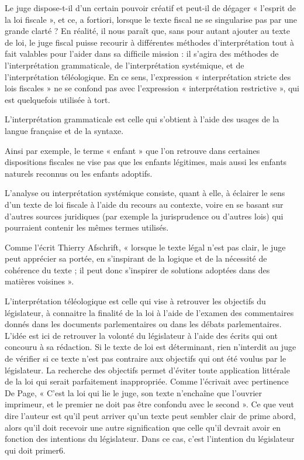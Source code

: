 \documentclass{book}
\begin{document}
Le juge dispose-t-il d’un certain pouvoir créatif et peut-il de dégager « l’esprit de la loi ﬁscale », et ce, a fortiori, lorsque le texte ﬁscal ne se singularise pas par une grande clarté ? En réalité, il nous paraît que, sans pour autant ajouter au texte de loi, le juge ﬁscal puisse recourir à différentes méthodes d’interprétation tout à fait valables pour l’aider dans sa difﬁcile mission : il s’agira des méthodes de l’interprétation grammaticale, de l’interprétation systémique, et de l’interprétation téléologique. En ce sens, l’expression « interprétation stricte des lois ﬁscales » ne se confond pas avec l’expression « interprétation restrictive », qui est quelquefois utilisée à tort.

L’interprétation grammaticale est celle qui s’obtient à l’aide des usages de la langue française et de la syntaxe.

Ainsi par exemple, le terme « enfant » que l’on retrouve dans certaines dispositions ﬁscales ne vise pas que les enfants légitimes, mais aussi les enfants naturels reconnus ou les enfants adoptifs.

L’analyse ou interprétation systémique consiste, quant à elle, à éclairer le sens d’un texte de loi ﬁscale à l’aide du recours au contexte, voire en se basant sur d’autres sources juridiques (par exemple la jurisprudence ou d’autres lois) qui pourraient contenir les mêmes termes utilisés.

Comme l’écrit Thierry Afschrift, « lorsque le texte légal n’est pas clair, le juge peut apprécier sa portée, en s’inspirant de la logique et de la nécessité de cohérence du texte ; il peut donc s’inspirer de solutions adoptées dans des matières voisines ».

L’interprétation téléologique est celle qui vise à retrouver les objectifs du législateur, à connaitre la ﬁnalité de la loi à l’aide de l’examen des commentaires donnés dans les documents parlementaires ou dans les débats parlementaires. L’idée est ici de retrouver la volonté du législateur à l’aide des écrits qui ont concouru à sa rédaction. Si le texte de loi est déterminant, rien n’interdit au juge de vériﬁer si ce texte n’est pas contraire aux objectifs qui ont été voulus par le législateur. La recherche des objectifs permet d’éviter toute application littérale de la loi qui serait parfaitement inappropriée. Comme l’écrivait avec pertinence De Page, « C’est la loi qui lie le juge, son texte n’enchaîne que l’ouvrier imprimeur, et le premier ne doit pas être confondu avec le second ». Ce que veut dire l’auteur est qu’il peut arriver qu’un texte peut sembler clair de prime abord, alors qu’il doit recevoir une autre signiﬁcation que celle qu’il devrait avoir en fonction des intentions du législateur. Dans ce cas, c’est l’intention du législateur qui doit primer6.
\end{document}
